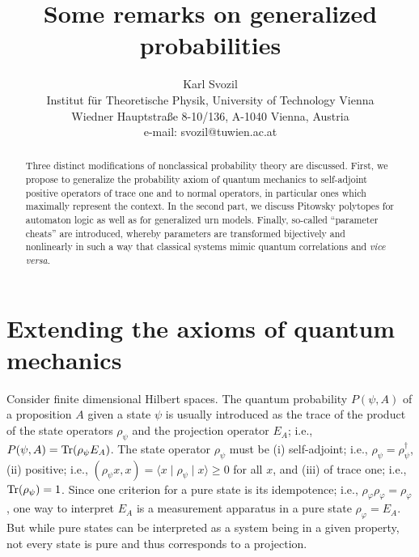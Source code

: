 \RequirePackage{graphicx}


\sloppy



\title{Some remarks on generalized probabilities}
\author{Karl Svozil\\
 {\small Institut f\"ur Theoretische Physik, University of Technology Vienna }     \\
  {\small Wiedner Hauptstra\ss e 8-10/136,}
  {\small A-1040 Vienna, Austria   }            \\
  {\small e-mail: svozil@tuwien.ac.at}}
\date{ }
\maketitle


\begin{abstract}
Three distinct modifications of nonclassical probability theory are discussed.
First, we propose to generalize the probability axiom of quantum mechanics
to self-adjoint positive operators of trace one and to normal operators,
in particular ones which maximally represent the context.
In the second part, we discuss Pitowsky polytopes for automaton logic
as well as for generalized urn models.
Finally, so-called ``parameter cheats'' are introduced, whereby parameters
are transformed bijectively and nonlinearly in such a way that classical systems
mimic quantum correlations and {\it vice versa}.
\end{abstract}


\section{Extending the axioms of quantum mechanics}

Consider finite dimensional Hilbert spaces.
The quantum  probability $P(\psi , A)$ of a proposition $A$ given a state $\psi$
is usually introduced as
the trace of the product of the state operators $\rho_\psi $
and the projection operator $E_A$; i.e.,
$P(\psi ,A)={\rm Tr}(\rho_\psi  E_A)$.
The state operator $\rho_\psi$ must be
(i)  self-adjoint; i.e., $\rho_\psi =\rho_\psi ^\dagger$,
(ii) positive; i.e., $(\rho_\psi  x,x) =\langle x\mid \rho_\psi  \mid x\rangle \ge 0$ for all $x$, and
(iii) of trace one; i.e., ${\rm Tr} (\rho_\psi )=1$.
Since one criterion for a pure state is its idempotence; i.e., $\rho_\varphi \rho_\varphi =\rho_\varphi$,
one way to interpret $E_A$ is a measurement apparatus in a pure state $\rho_\varphi= E_A$.
But while pure states can be interpreted as a system being in a given property,
not every state is pure and thus corresponds to a projection.


